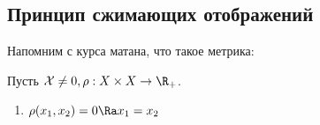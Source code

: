 
\subsection{Принцип сжимающих отображений}
Напомним с курса матана, что такое метрика:

\begin{definition} Пусть $\mathcal{X} \ne 0, \rho: X \times X \rightarrow \R_+$. 
  \begin{enumerate}2
    \item $\rho(x_1, x_2) = 0 \Ra x_1 = x_2$
  \end{enumerate}
  
\end{definition}